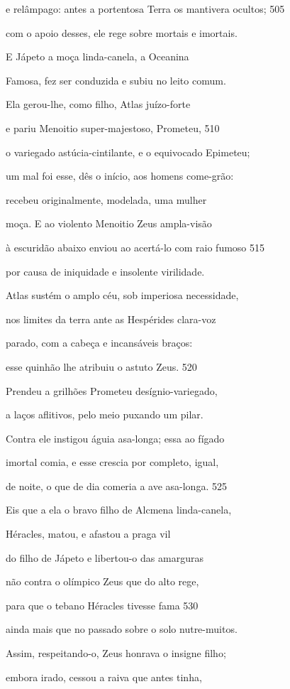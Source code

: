 e relâmpago: antes a portentosa Terra os mantivera ocultos; \num{505}

com o apoio desses, ele rege sobre mortais e imortais.

\quad{}E Jápeto a moça linda-canela, a Oceanina

Famosa, fez ser conduzida e subiu no leito comum.

Ela gerou-lhe, como filho, Atlas juízo-forte

e pariu Menoitio super-majestoso, Prometeu, \num{510}

o variegado astúcia-cintilante, e o equivocado Epimeteu;

um mal foi esse, dês o início, aos homens come-grão:

recebeu originalmente, modelada, uma mulher

moça. E ao violento Menoitio Zeus ampla-visão

à escuridão abaixo enviou ao acertá-lo com raio fumoso \num{515}

por causa de iniquidade e insolente virilidade.

Atlas sustém o amplo céu, sob imperiosa necessidade,

nos limites da terra ante as Hespérides clara-voz

parado, com a cabeça e incansáveis braços:

esse quinhão lhe atribuiu o astuto Zeus. \num{520}

Prendeu a grilhões Prometeu desígnio-variegado,

a laços aflitivos, pelo meio puxando um pilar.

Contra ele instigou águia asa-longa; essa ao fígado

imortal comia, e esse crescia por completo, igual,

de noite, o que de dia comeria a ave asa-longa. \num{525}

Eis que a ela o bravo filho de Alcmena linda-canela,

Héracles, matou, e afastou a praga vil

do filho de Jápeto e libertou-o das amarguras

não contra o olímpico Zeus que do alto rege,

para que o tebano Héracles tivesse fama \num{530}

ainda mais que no passado sobre o solo nutre-muitos.

Assim, respeitando-o, Zeus honrava o insigne filho;

embora irado, cessou a raiva que antes tinha,


